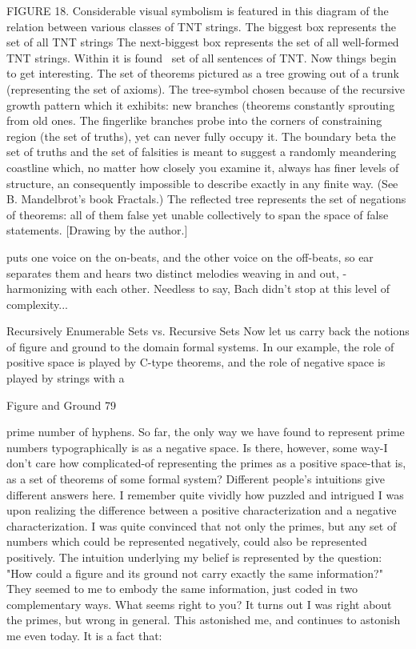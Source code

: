 FIGURE 18. Considerable visual symbolism is featured in this diagram of the relation
between various classes of TNT strings. The biggest box represents the set of all TNT
strings The next-biggest box represents the set of all well-formed TNT strings. Within it is
found~ set of all sentences of TNT. Now things begin to get interesting. The set of
theorems pictured as a tree growing out of a trunk (representing the set of axioms). The
tree-symbol chosen because of the recursive growth pattern which it exhibits: new
branches (theorems constantly sprouting from old ones. The fingerlike branches probe
into the corners of constraining region (the set of truths), yet can never fully occupy it.
The boundary beta the set of truths and the set of falsities is meant to suggest a randomly
meandering coastline which, no matter how closely you examine it, always has finer
levels of structure, an consequently impossible to describe exactly in any finite way. (See
B. Mandelbrot's book Fractals.) The reflected tree represents the set of negations of
theorems: all of them false yet unable collectively to span the space of false statements.
[Drawing by the author.]

puts one voice on the on-beats, and the other voice on the off-beats, so ear separates them
and hears two distinct melodies weaving in and out, - harmonizing with each other.
Needless to say, Bach didn't stop at this level of complexity...

                    Recursively Enumerable Sets vs. Recursive Sets
        Now let us carry back the notions of figure and ground to the domain formal
systems. In our example, the role of positive space is played by C-type theorems, and the
role of negative space is played by strings with a




Figure and Ground                                                                        79

prime number of hyphens. So far, the only way we have found to represent prime
numbers typographically is as a negative space. Is there, however, some way-I don't care
how complicated-of representing the primes as a positive space-that is, as a set of
theorems of some formal system?
       Different people's intuitions give different answers here. I remember quite vividly
how puzzled and intrigued I was upon realizing the difference between a positive
characterization and a negative characterization. I was quite convinced that not only the
primes, but any set of numbers which could be represented negatively, could also be
represented positively. The intuition underlying my belief is represented by the question:
"How could a figure and its ground not carry exactly the same information?" They
seemed to me to embody the same information, just coded in two complementary ways.
What seems right to you?
       It turns out I was right about the primes, but wrong in general. This astonished
me, and continues to astonish me even today. It is a fact that:

